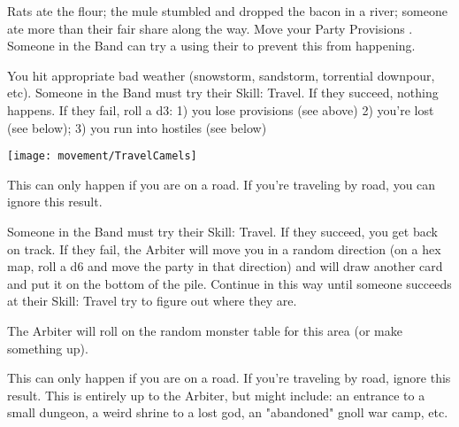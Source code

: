 


  Rats ate the flour; the mule stumbled and dropped the bacon in a river; someone ate more than their fair share along the way.  Move your Party Provisions \DCDOWN.  Someone in the Band can try a \RO using their  to prevent this from happening.


\newpage 



  You hit appropriate bad weather (snowstorm, sandstorm, torrential downpour, etc).  Someone in the Band must try their Skill: Travel.  If they succeed, nothing happens.  If they fail, roll a d3:  1) you lose provisions (see above) 2) you're lost (see below); 3) you run into hostiles (see below)



\texttt{[image: movement/TravelCamels]}


  This can only happen if you are  on a road. If you're traveling by road, you can ignore this result.

  Someone in the Band must try their Skill: Travel.  If they succeed, you get back on track.  If they fail, the Arbiter will move you in a random direction (on a hex map, roll a d6 and move the party in that direction) and will draw another card and put it on the bottom of the pile. Continue in this way until someone succeeds at their Skill: Travel try to figure out where they are.



  The Arbiter will roll on the random monster table for this area (or make something up).



  This can only happen if you are  on a road. If you're traveling by road, ignore this result.  This is entirely up to the Arbiter, but might include: an entrance to a small dungeon, a weird shrine to a lost god, an "abandoned" gnoll war camp, etc.

